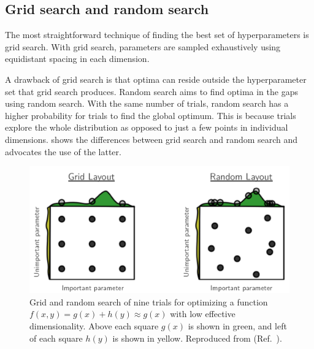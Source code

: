 \subsection{Grid search and random search}
The most straightforward technique of finding the best set of hyperparameters is grid search.
With grid search, parameters are sampled exhaustively using equidistant spacing in each dimension.

A drawback of grid search is that optima can reside outside the hyperparameter set that grid search produces.
Random search \cite{Bergstra2012} aims to find optima in the gaps using random search.
With the same number of trials, random search has a higher probability for trials to find the global optimum.
This is because trials explore the whole distribution as opposed to just a few points in individual dimensions.
 shows the differences between grid search and random search and advocates the use of the latter.

\begin{figure}
    \includegraphics[width=\linewidth]{images/gridrandsearch.png}
    \caption[Grid and random search]{
        Grid and random search of nine trials for optimizing a function $f(x, y) = g(x) + h(y) \approx g(x)$ with low effective dimensionality.
        Above each square $g(x)$ is shown in green, and left of each square $h(y)$ is shown in yellow.
        Reproduced from  (Ref.~\cite{Bergstra2012}).
    }
    \label{fig:gridrandsearch}
\end{figure}

